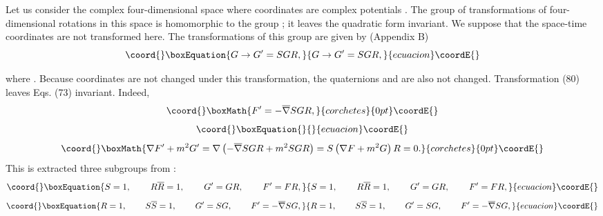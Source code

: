 \documentclass[a4paper,12pt]{article}
\begin{document}
Let us consider the complex four-dimensional space where
coordinates are complex potentials \coordHE{}. The group of transformations of
four-dimensional rotations in this space is homomorphic to the
group \coordHE{}; it leaves the quadratic form \coordHE{}
invariant. We suppose that the space-time coordinates \coordHE{} are
not transformed here. The transformations of this group are given
by (Appendix B)
\begin{equation}\coord{}\boxEquation{
G\rightarrow G^{\prime }=SGR,  \label{80}
}{
G\rightarrow G^{\prime }=SGR,  }{ecuacion}\coordE{}\end{equation}

where \coordHE{}. Because coordinates are not changed
under this transformation, the quaternions \myHighlight{$\nabla $}\coordHE{} and \myHighlight{$\overline{\nabla }$}\coordHE{}
are also not changed. Transformation (80) leaves Eqs. (73) invariant.
Indeed,
\[\coord{}\boxMath{
F^{\prime }=-\overline{\nabla }SGR,
}{corchetes}{0pt}\coordE{}\]
\vspace{-8mm}
\begin{equation}\coord{}\boxEquation{
\label{81}
}{
}{ecuacion}\coordE{}\end{equation}
\vspace{-8mm}
\[\coord{}\boxMath{
\nabla F^{\prime }+m^2G^{\prime }=\nabla \left( -\overline{\nabla
} SGR+m^2SGR\right) =S\left( \nabla F+m^2G\right) R=0 .
}{corchetes}{0pt}\coordE{}\]
This is extracted three subgroups \coordHE{} from \coordHE{}:
\begin{equation}\coord{}\boxEquation{
S=1,\hspace{0.3in}R\overline{R}=1,\hspace{0.3in}G^{\prime
}=GR,\hspace{0.3in}F^{\prime }=FR,  \label{82}
}{
S=1,\hspace{0.3in}R\overline{R}=1,\hspace{0.3in}G^{\prime
}=GR,\hspace{0.3in}F^{\prime }=FR,  }{ecuacion}\coordE{}\end{equation}
\begin{equation}\coord{}\boxEquation{
R=1,\hspace{0.3in}S\overline{S}=1,\hspace{0.3in}G^{\prime
}=SG,\hspace{0.3in}F^{\prime }=- \overline{\nabla }SG,  \label{83}
}{
R=1,\hspace{0.3in}S\overline{S}=1,\hspace{0.3in}G^{\prime
}=SG,\hspace{0.3in}F^{\prime }=- \overline{\nabla }SG,  }{ecuacion}\coordE{}\end{equation}
\end{document}
